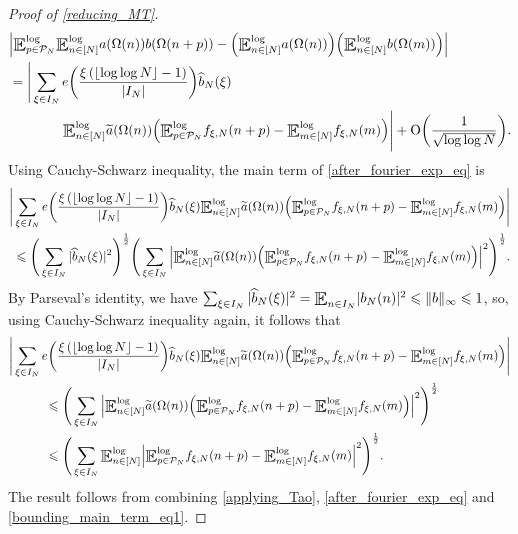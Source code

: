\documentclass[letter,11pt]{article}
\theoremstyle{plain} %
\theoremstyle{definition} %
\theoremstyle{plain}
\theoremstyle{plain}
\theoremstyle{plain}
\numberwithin{equation}{section}
\newcommand{\Oh}{{\mathrm O}}
\renewcommand{\leq}{\leqslant}
\newcommand{\E}{\raisebox{-0.4ex}{\scalebox{1.4}[1.3]{$\mathbb{E}$}}}
\newcommand{\Esub}[1]{\raisebox{-0.4ex}{\scalebox{1.4}[1.3]{$\mathbb{E}$}}\raisebox{-0.35ex}{\ensuremath{_{\scriptstyle #1}}}}
\newcommand{\logE}{{\E}^{\log}}
\newcommand{\1}{\mathbbm{1}}
\newcommand{\f}{f_{\xi,N}}
\newcommand{\Pc}{\mathcal{P}}
\begin{document}
\begin{proof}[Proof of \cref{reducing_MT}]
\begin{align}\label{after_fourier_exp_eq}
    & \Big|\logE_{p\in\Pc_N}\logE_{n\in[N]}a(\Omega(n))b(\Omega(n+p)) - \Big(\logE_{n\in[N]}a(\Omega(n))\Big)\Big(\logE_{n\in[N]}b(\Omega(m))\Big)\Big| \notag \\
    & = \Bigg|\sum_{\xi\in I_N} e\bigg(\frac{\xi\left(\lfloor\log\log{N}\rfloor-1\right)}{|I_N|}\bigg)\widehat{b}_N(\xi) \notag \\
    & \hspace*{1.4cm} \logE_{n\in[N]}\widetilde{a}(\Omega(n))
    \Big(\logE_{p\in\Pc_N}\f(n+p) - \logE_{m\in[N]}\f(m)\Big)\Bigg| + \Oh\bigg(\frac{1}{\sqrt{\log\log{N}}}\bigg).
\end{align}
Using Cauchy-Schwarz inequality, the main term of \eqref{after_fourier_exp_eq} is
\begin{align*}
    \Bigg|\sum_{\xi\in I_N} e\bigg(\frac{\xi\left(\lfloor\log\log{N}\rfloor-1\right)}{|I_N|}\bigg)\widehat{b}_N(\xi)\logE_{n\in[N]}\widetilde{a}(\Omega(n))
    \Big(\logE_{p\in\Pc_N}\f(n+p) - \logE_{m\in[N]}\f(m)\Big)\Bigg| & \\
    \leq \Bigg(\sum_{\xi\in I_N}|\widehat{b}_N(\xi)|^2\Bigg)^\frac{1}{2}
    \Bigg(\sum_{\xi\in I_N}\Big|\logE_{n\in[N]}\widetilde{a}(\Omega(n))
    \Big(\logE_{p\in\Pc_N}\f(n+p) - \logE_{m\in[N]}\f(m)\Big)\Big|^2\Bigg)^\frac{1}{2}. &
\end{align*}
By Parseval's identity, we have
$\sum_{\xi\in I_N}|\widehat{b}_N(\xi)|^2
= \Esub{n\in I_N}|b_N(n)|^2
\leq \|b\|_\infty
\leq 1$,
so, using Cauchy-Schwarz inequality again, it follows that
\begin{align}\label{bounding_main_term_eq1}
    & \Bigg|\sum_{\xi\in I_N} e\bigg(\frac{\xi\left(\lfloor\log\log{N}\rfloor-1\right)}{|I_N|}\bigg)\widehat{b}_N(\xi)\logE_{n\in[N]}\widetilde{a}(\Omega(n))
    \Big(\logE_{p\in\Pc_N}\f(n+p) - \logE_{m\in[N]}\f(m)\Big)\Bigg| \notag \\
    & \hspace*{1cm} \leq \Bigg(\sum_{\xi\in I_N}\Big|\logE_{n\in[N]}\widetilde{a}(\Omega(n))
    \Big(\logE_{p\in\Pc_N}\f(n+p) - \logE_{m\in[N]}\f(m)\Big)\Big|^2\Bigg)^\frac{1}{2} \notag \\
    & \hspace*{1cm} \leq \Bigg(\sum_{\xi\in I_N}\logE_{n\in[N]}
    \Big|\logE_{p\in\Pc_N}\f(n+p) - \logE_{m\in[N]}\f(m)\Big|^2\Bigg)^\frac{1}{2}. 
\end{align}
The result follows from combining \eqref{applying_Tao}, \eqref{after_fourier_exp_eq} and \eqref{bounding_main_term_eq1}.
\end{proof}
\end{document}
